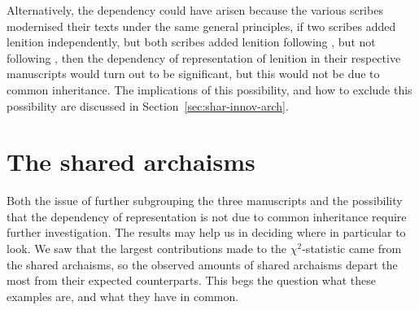 Alternatively, the dependency could have arisen because the various scribes modernised their texts under the same general principles, \eg if two scribes added lenition independently, but both scribes added lenition following , but not following , then the dependency of representation of lenition in their respective manuscripts would turn out to be significant, but this would not be due to common inheritance. The implications of this possibility, and how to exclude this possibility are discussed in Section~\ref{sec:shar-innov-arch}. 

\section{The shared archaisms}
\label{sec:beyond-stat-again}

Both the issue of further subgrouping the three manuscripts and the  possibility that the dependency of representation is not due to common inheritance require further investigation. The results may help us in deciding where in particular to look. We saw that the largest contributions made to the \(\chi^2\)-statistic came from the shared archaisms, so the observed amounts of shared archaisms depart the most from their expected counterparts. This begs the question what these examples are, and what they have in common. 



